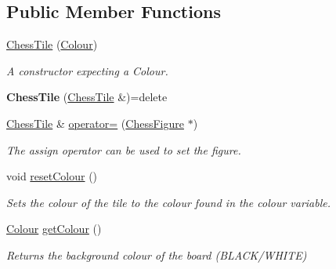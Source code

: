 \subsection*{Public Member Functions}
\begin{DoxyCompactItemize}
\item 
\mbox{\label{classChessTile_a73d03ca0ed979d33e05316b9b14c20d2}} 
\mbox{\hyperlink{classChessTile_a73d03ca0ed979d33e05316b9b14c20d2}{Chess\+Tile}} (\mbox{\hyperlink{classChessTile_a9c573776c908586046e63facd4756e4d}{Colour}})
\begin{DoxyCompactList}\small\item\em A constructor expecting a Colour. \end{DoxyCompactList}\item 
\mbox{\label{classChessTile_a20bec4843dae5df211f99bc26b18c9b5}} 
{\bfseries Chess\+Tile} (\mbox{\hyperlink{classChessTile}{Chess\+Tile}} \&)=delete
\item 
\mbox{\label{classChessTile_ae9dc270be7b2b2b7427eb7bc5e9b2842}} 
\mbox{\hyperlink{classChessTile}{Chess\+Tile}} \& \mbox{\hyperlink{classChessTile_ae9dc270be7b2b2b7427eb7bc5e9b2842}{operator=}} (\mbox{\hyperlink{classChessFigure}{Chess\+Figure}} $\ast$)
\begin{DoxyCompactList}\small\item\em The assign operator can be used to set the figure. \end{DoxyCompactList}\item 
\mbox{\label{classChessTile_a310a1691be6e8e58f452ec817ab3db2f}} 
void \mbox{\hyperlink{classChessTile_a310a1691be6e8e58f452ec817ab3db2f}{reset\+Colour}} ()
\begin{DoxyCompactList}\small\item\em Sets the colour of the tile to the colour found in the colour variable. \end{DoxyCompactList}\item 
\mbox{\label{classChessTile_af88f05cd0b3ea319cd11a78aec92499f}} 
\mbox{\hyperlink{classChessTile_a9c573776c908586046e63facd4756e4d}{Colour}} \mbox{\hyperlink{classChessTile_af88f05cd0b3ea319cd11a78aec92499f}{get\+Colour}} ()
\begin{DoxyCompactList}\small\item\em Returns the background colour of the board (B\+L\+A\+C\+K/\+W\+H\+I\+TE) \end{DoxyCompactList}\item 

\end{DoxyCompactItemize}
